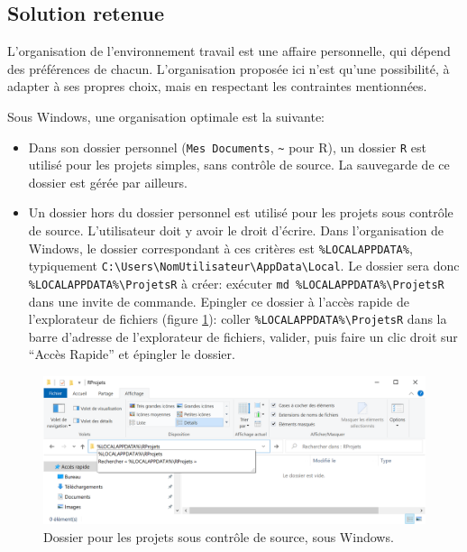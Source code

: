 \documentclass[
  12pt,
  french,
  a4paper,
  extrafontsizes,onecolumn,openright
  ]{memoir}
\providecommand{\tightlist}{%
  \setlength{\itemsep}{0pt}\setlength{\parskip}{0pt}}
\begin{document}
\hypertarget{sec:solution-dossiers}{%
\subsection{Solution retenue}\label{sec:solution-dossiers}}

L'organisation de l'environnement travail est une affaire personnelle, qui dépend des préférences de chacun.
L'organisation proposée ici n'est qu'une possibilité, à adapter à ses propres choix, mais en respectant les contraintes mentionnées.

Sous Windows, une organisation optimale est la suivante:

\begin{itemize}
\tightlist
\item
  Dans son dossier personnel (\texttt{Mes\ Documents}, \texttt{\textasciitilde{}} pour R), un dossier \texttt{R} est utilisé pour les projets simples, sans contrôle de source.
  La sauvegarde de ce dossier est gérée par ailleurs.
\item
  Un dossier hors du dossier personnel est utilisé pour les projets sous contrôle de source.
  L'utilisateur doit y avoir le droit d'écrire.
  Dans l'organisation de Windows, le dossier correspondant à ces critères est \texttt{\%LOCALAPPDATA\%}, typiquement \texttt{C:\textbackslash{}Users\textbackslash{}NomUtilisateur\textbackslash{}AppData}\break\texttt{\textbackslash{}Local}.
  Le dossier sera donc \texttt{\%LOCALAPPDATA\%\textbackslash{}ProjetsR} à créer: exécuter \texttt{md\ \%LOCALAPPDATA\%\textbackslash{}ProjetsR} dans une invite de commande.
  Epingler ce dossier à l'accès rapide de l'explorateur de fichiers (figure \ref{fig:R-ProjetsR}): coller \texttt{\%LOCALAPPDATA\%\textbackslash{}ProjetsR} dans la barre d'adresse de l'explorateur de fichiers, valider, puis faire un clic droit sur \enquote{Accès Rapide} et épingler le dossier.
\end{itemize}



\scriptsize

\begin{figure}

{\centering \includegraphics[width=1\linewidth]{images/R-ProjetsR} 

}

\caption{Dossier pour les projets sous contrôle de source, sous Windows.}\label{fig:R-ProjetsR}
\end{figure}
\end{document}
